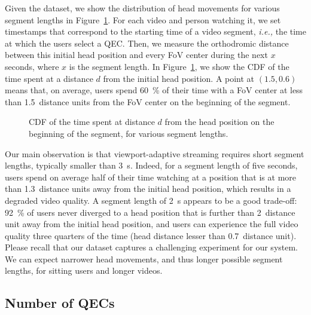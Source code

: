 Given the dataset, we show the distribution of head movements for
various segment lengths in Figure~\ref{cdf-dataset}. For each video
and person watching it, we set timestamps that correspond to the
starting time of a video segment, \textit{i.e.,} the time at which the
users select a \ac{QEC}. Then, we measure the orthodromic distance
between this initial head position and every \ac{FoV} center during
the next $x$ seconds, where $x$ is the segment length. In
Figure~\ref{cdf-dataset}, we show the \ac{CDF} of the time spent at a
distance $d$ from the initial head position. 
A point at $(1.5,0.6)$
means that, on average, users spend \SI{60}{\percent} of their time
with a \ac{FoV} center at less than \num{1.5}~distance units from the
\ac{FoV} center on the beginning of the segment.

\begin{figure}
\centering

\caption{CDF of the time spent at distance $d$ from the head position on the beginning of the
segment, for various segment lengths.}\label{cdf-dataset}
\end{figure}

Our main observation is that viewport-adaptive streaming requires
short segment lengths, typically smaller than \SI{3}{\second}. Indeed,
for a segment length of five seconds, users spend on average half of
their time watching at a position that is at more than
\num{1.3}~distance units away from the initial head position, which
results in a degraded video quality. A segment length of
\SI{2}{\second} appears to be a good trade-off: \SI{92}{\percent} of
users never diverged to a head position that is further than
\num{2}~distance unit away from the initial head position, and users
can experience the full video quality three quarters of the time (head distance
lesser than \num{0.7}~distance unit). Please recall that our dataset
captures a challenging experiment for our system. We can expect
narrower head movements, and thus longer possible segment lengths, for
sitting users and longer videos.


\subsection{Number of \acp{QEC}}

